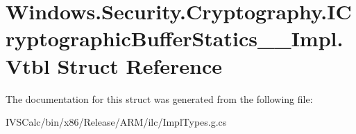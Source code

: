 \hypertarget{struct_windows_1_1_security_1_1_cryptography_1_1_i_cryptographic_buffer_statics_____impl_1_1_vtbl}{}\section{Windows.\+Security.\+Cryptography.\+I\+Cryptographic\+Buffer\+Statics\+\_\+\+\_\+\+Impl.\+Vtbl Struct Reference}
\label{struct_windows_1_1_security_1_1_cryptography_1_1_i_cryptographic_buffer_statics_____impl_1_1_vtbl}


The documentation for this struct was generated from the following file\+:\begin{DoxyCompactItemize}
\item 
I\+V\+S\+Calc/bin/x86/\+Release/\+A\+R\+M/ilc/Impl\+Types.\+g.\+cs\end{DoxyCompactItemize}
